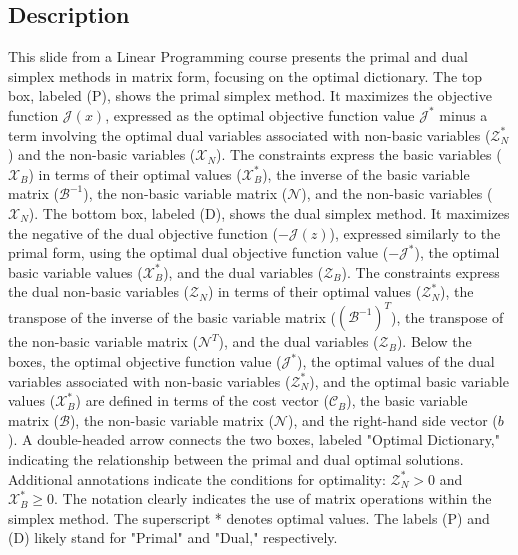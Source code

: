 \documentclass{article}%
\begin{document}
\subsection{Description}%
This slide from a Linear Programming course presents the primal and dual simplex methods in matrix form, focusing on the optimal dictionary. The top box, labeled (P), shows the primal simplex method. It maximizes the objective function $\mathcal{J}(x)$, expressed as the optimal objective function value $\mathcal{J}^*$ minus a term involving the optimal dual variables associated with non-basic variables ($\mathcal{Z}_N^*$) and the non-basic variables ($\mathcal{X}_N$). The constraints express the basic variables ($\mathcal{X}_B$) in terms of their optimal values ($\mathcal{X}_B^*$), the inverse of the basic variable matrix ($\mathcal{B}^{-1}$), the non-basic variable matrix ($\mathcal{N}$), and the non-basic variables ($\mathcal{X}_N$). The bottom box, labeled (D), shows the dual simplex method. It maximizes the negative of the dual objective function ($-\mathcal{J}(z)$), expressed similarly to the primal form, using the optimal dual objective function value ($-\mathcal{J}^*$), the optimal basic variable values ($\mathcal{X}_B^*$), and the dual variables ($\mathcal{Z}_B$). The constraints express the dual non-basic variables ($\mathcal{Z}_N$) in terms of their optimal values ($\mathcal{Z}_N^*$), the transpose of the inverse of the basic variable matrix ($(\mathcal{B}^{-1})^T$), the transpose of the non-basic variable matrix ($\mathcal{N}^T$), and the dual variables ($\mathcal{Z}_B$). Below the boxes, the optimal objective function value ($\mathcal{J}^*$), the optimal values of the dual variables associated with non-basic variables ($\mathcal{Z}_N^*$), and the optimal basic variable values ($\mathcal{X}_B^*$) are defined in terms of the cost vector ($\mathcal{C}_B$), the basic variable matrix ($\mathcal{B}$), the non-basic variable matrix ($\mathcal{N}$), and the right-hand side vector ($b$).  A double-headed arrow connects the two boxes, labeled "Optimal Dictionary," indicating the relationship between the primal and dual optimal solutions.  Additional annotations indicate the conditions for optimality: $\mathcal{Z}_N^* > 0$ and $\mathcal{X}_B^* \ge 0$. The notation clearly indicates the use of matrix operations within the simplex method. The superscript * denotes optimal values. The labels (P) and (D) likely stand for "Primal" and "Dual," respectively.%
\end{document}
